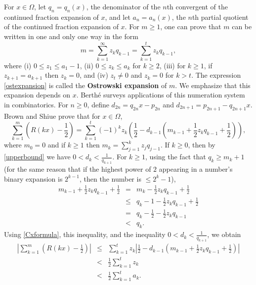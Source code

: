 \documentclass{amsart}
\begin{document}
For $x \in \Omega$, let $q_n=q_n(x)$, the denominator of the $n$th convergent of the continued fraction expansion of $x$,
 and let $a_n=a_n(x)$, the $n$th partial quotient of the continued fraction expansion of $x$. For $m \geq 1$, one can prove
 \cite[p.~211, Proposition~1]{berthe} that $m$ can be written in one and only one way in the form
\begin{equation}
 m=\sum_{k=1}^\infty z_k q_{k-1}=\sum_{k=1}^t z_k q_{k-1},
 \label{ostexpansion}
\end{equation}
 where (i) $0 \leq z_1 \leq a_1-1$, (ii) $0 \leq z_k \leq a_k$ for $k \geq 2$, (iii) for $k \geq 1$, if $z_{k+1}=a_{k+1}$ then
 $z_k=0$, and (iv) $z_t \neq 0$ and $z_k=0$ for $k>t$. The expression \eqref{ostexpansion} is called the \textbf{Ostrowski expansion} of $m$. We emphasize that
 this expansion depends on $x$. Berth\'e \cite{berthe} surveys applications of this numeration system in combinatorics.
 For $n \geq 0$, define $d_{2n}=q_{2n}x-p_{2n}$ and $d_{2n+1}=p_{2n+1}-q_{2n+1}x$. 
 Brown and Shiue \cite[p.~184, Theorem~1]{MR1316813} prove that for $x \in \Omega$,
\begin{equation}
\sum_{k=1}^m \left(R(kx)-\frac{1}{2}\right)=\sum_{k=1}^t (-1)^k z_k\left( \frac{1}{2}-d_{k-1}\left(m_{k-1}+\frac{1}{2}z_k q_{k-1}+\frac{1}{2}\right) \right),
\label{Cxformula}
\end{equation}
where $m_0=0$ and if $k \geq 1$ then $m_k=\sum_{j=1}^k z_j q_{j-1}$.
If $k \geq 0$, then by \eqref{upperbound} we have $0<d_k<\frac{1}{q_{k+1}}$.
For $k \geq 1$, using the fact that $q_k \geq m_k+1$ (for the same reason that if the highest power of $2$ appearing in a number's binary expansion is $2^{k-1}$, then the number
is $\leq 2^k-1$),
\begin{eqnarray*}
m_{k-1}+\frac{1}{2}z_k q_{k-1}+\frac{1}{2}&=&m_k-\frac{1}{2}z_kq_{k-1} + \frac{1}{2}\\
&\leq&q_k-1-\frac{1}{2}z_kq_{k-1} + \frac{1}{2}\\
&=&q_k-\frac{1}{2}-\frac{1}{2}z_kq_{k-1}\\
&<&q_k.
\end{eqnarray*} 
Using \eqref{Cxformula}, this inequality, and the inequality $0<d_k<\frac{1}{q_{k+1}}$, we obtain
\begin{eqnarray*}
\left| \sum_{k=1}^m \left(R(kx)-\frac{1}{2}\right) \right| &\leq& \sum_{k=1}^t z_k \left|\frac{1}{2}-d_{k-1}\left(m_{k-1}+\frac{1}{2}z_k q_{k-1}+\frac{1}{2}\right) \right|\\
&<&\frac{1}{2}\sum_{k=1}^t z_k\\
&<&\frac{1}{2}\sum_{k=1}^t a_k.
\end{eqnarray*}
\end{document}
